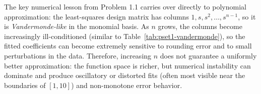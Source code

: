 \noindent The key numerical lesson from Problem 1.1 carries over directly to polynomial approximation: the least-squares design matrix has columns $1,s,s^2,\dots,s^{n-1}$, so it is \emph{Vandermonde-like} in the monomial basis. As $n$ grows, the columns become increasingly ill-conditioned (similar to Table~\ref{tab:pset1-vandermonde}), so the fitted coefficients can become extremely sensitive to rounding error and to small perturbations in the data. Therefore, increasing $n$ does not guarantee a uniformly better approximation: the function space is richer, but numerical instability can dominate and produce oscillatory or distorted fits (often most visible near the boundaries of $[1,10]$) and non-monotone error behavior.



